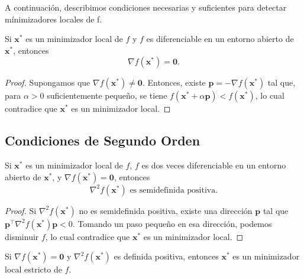 A continuación, describimos condiciones necesarias y suficientes para detectar mínimizadores locales de f.

\begin{teorema}
\label{teo:cond_nec_1}
Si $\mathbf{x}^*$ es un minimizador local de $f$ y $f$ es diferenciable en un entorno abierto de $\mathbf{x}^*$, entonces
\begin{equation}
\nabla f(\mathbf{x}^*) = \mathbf{0}.
\end{equation}
\end{teorema}

\begin{proof}
Supongamos que $\nabla f(\mathbf{x}^*) \neq \mathbf{0}$. Entonces, existe $\mathbf{p} = -\nabla f(\mathbf{x}^*)$ tal que, para $\alpha > 0$ suficientemente pequeño, se tiene $f(\mathbf{x}^* + \alpha \mathbf{p}) < f(\mathbf{x}^*)$, lo cual contradice que $\mathbf{x}^*$ es un minimizador local.
\end{proof}

\subsection{Condiciones de Segundo Orden}

\begin{teorema}
\label{teo:cond_nec_2}
Si $\mathbf{x}^*$ es un minimizador local de $f$, $f$ es dos veces diferenciable en un entorno abierto de $\mathbf{x}^*$, y $\nabla f(\mathbf{x}^*) = \mathbf{0}$, entonces
\begin{equation}
\nabla^2 f(\mathbf{x}^*) \text{ es semidefinida positiva}.
\end{equation}
\end{teorema}

\begin{proof}
Si $\nabla^2 f(\mathbf{x}^*)$ no es semidefinida positiva, existe una dirección $\mathbf{p}$ tal que $\mathbf{p}^\top \nabla^2 f(\mathbf{x}^*) \mathbf{p} < 0$. Tomando un paso pequeño en esa dirección, podemos disminuir $f$, lo cual contradice que $\mathbf{x}^*$ es un minimizador local.
\end{proof}

\begin{teorema}
\label{teo:cond_suf_2}
Si $\nabla f(\mathbf{x}^*) = \mathbf{0}$ y $\nabla^2 f(\mathbf{x}^*)$ es definida positiva, entonces $\mathbf{x}^*$ es un minimizador local estricto de $f$.
\end{teorema}

